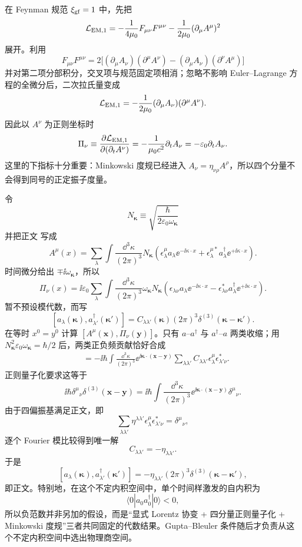 \begin{derivation}
在 Feynman 规范 $\xi_{\rm gf}=1$ 中，先把
\[
\mathcal L_{\rm EM,1}
=-\frac1{4\mu_0}F_{\mu\nu}F^{\mu\nu}
-\frac1{2\mu_0}(\partial_\mu A^\mu)^2
\]
展开。利用
\[
F_{\mu\nu}F^{\mu\nu}
=2\bigl[(\partial_\mu A_\nu)(\partial^\mu A^\nu)
-(\partial_\mu A_\nu)(\partial^\nu A^\mu)\bigr]
\]
并对第二项分部积分，交叉项与规范固定项相消；忽略不影响 Euler--Lagrange 方程的全微分后，二次拉氏量变成
\[
\mathcal L_{\rm EM,1}
=-\frac1{2\mu_0}(\partial_\mu A_\nu)(\partial^\mu A^\nu).
\]
因此以 $A^\nu$ 为正则坐标时
\[
\Pi_\nu
\equiv\frac{\partial\mathcal L_{\rm EM,1}}
{\partial(\partial_t A^\nu)}
=-\frac1{\mu_0c^2}\partial_tA_\nu
=-\varepsilon_0\partial_tA_\nu.
\]
这里的下指标十分重要：Minkowski 度规已经进入 $A_\nu=\eta_{\nu\rho}A^\rho$，所以四个分量不会得到同号的正定振子度量。

令
\[
N_{\boldsymbol\kappa}
\equiv\sqrt{\frac{\hbar}{2\varepsilon_0\omega_{\boldsymbol\kappa}}}
\]
并把正文 写成
\[
A^\mu(x)=\sum_\lambda\int\frac{\dd^3\kappa}{(2\pi)^3}N_{\boldsymbol\kappa}
\left(\epsilon_\lambda^\mu a_\lambda \ee^{-\ii\kappa\cdot x}
+\epsilon_\lambda^{\mu *}a_\lambda^\dagger \ee^{+\ii\kappa\cdot x}\right).
\]
时间微分给出 $\mp\ii\omega_{\boldsymbol\kappa}$，所以
\[
\Pi_\nu(x)=\ii\varepsilon_0\sum_\lambda\int\frac{\dd^3\kappa}{(2\pi)^3}
\omega_{\boldsymbol\kappa}N_{\boldsymbol\kappa}
\left(\epsilon_{\lambda\nu}a_\lambda \ee^{-\ii\kappa\cdot x}
-\epsilon_{\lambda\nu}^*a_\lambda^\dagger \ee^{+\ii\kappa\cdot x}\right).
\]
暂不预设模代数，而写
\[
[a_\lambda(\boldsymbol\kappa),a_{\lambda'}^\dagger(\boldsymbol\kappa')]
=C_{\lambda\lambda'}(\boldsymbol\kappa)
(2\pi)^3\delta^{(3)}(\boldsymbol\kappa-\boldsymbol\kappa').
\]
在等时 $x^0=y^0$ 计算 $[A^\mu(\mathbf x),\Pi_\nu(\mathbf y)]$。只有 $a$--$a^\dagger$ 与 $a^\dagger$--$a$ 两类收缩；用 $N_{\boldsymbol\kappa}^2\varepsilon_0\omega_{\boldsymbol\kappa}=\hbar/2$ 后，两类正负频贡献恰好合成
\begin{align*}
[A^\mu(\mathbf x),\Pi_\nu(\mathbf y)]
&=-\ii\hbar\int\frac{\dd^3\kappa}{(2\pi)^3}
 \ee^{\ii\boldsymbol\kappa\cdot(\mathbf x-\mathbf y)}
 \sum_{\lambda\lambda'}C_{\lambda\lambda'}
 \epsilon_\lambda^\mu\epsilon_{\lambda'\nu}^*.
\end{align*}
正则量子化要求这等于
\[
\ii\hbar\delta^\mu{}_{\nu}\delta^{(3)}(\mathbf x-\mathbf y)
=\ii\hbar\int\frac{\dd^3\kappa}{(2\pi)^3}
 \ee^{\ii\boldsymbol\kappa\cdot(\mathbf x-\mathbf y)}\delta^\mu{}_{\nu}.
\]
由于四偏振基满足正文，即
\[
\sum_{\lambda\lambda'}\eta^{\lambda\lambda'}
\epsilon_\lambda^\mu\epsilon_{\lambda'\nu}^*=\delta^\mu{}_{\nu},
\]
逐个 Fourier 模比较得到唯一解
\[
\boxed{C_{\lambda\lambda'}=-\eta_{\lambda\lambda'}}.
\]
于是
\[
[a_\lambda(\boldsymbol\kappa),a_{\lambda'}^\dagger(\boldsymbol\kappa')]
=-\eta_{\lambda\lambda'}(2\pi)^3\delta^{(3)}(\boldsymbol\kappa-\boldsymbol\kappa'),
\]
即正文。特别地，在这个不定内积空间中，单个时间样激发的自内积为
\[
\langle0|a_0a_0^\dagger|0\rangle<0,
\]
所以负范数并非另加的假设，而是“显式 Lorentz 协变 + 四分量正则量子化 + Minkowski 度规”三者共同固定的代数结果。Gupta--Bleuler 条件随后才负责从这个不定内积空间中选出物理商空间。
\end{derivation}
